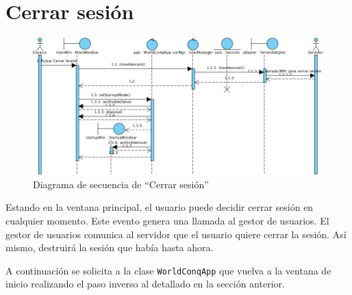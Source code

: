 \section{Cerrar sesión}

\begin{figure}[ht]
\centering
\includegraphics[scale=0.6]{img/ch03devel-logout.png}
\caption{Diagrama de secuencia de ``Cerrar sesión''}
\end{figure}

Estando en la ventana principal, el usuario puede decidir cerrar sesión en
cualquier momento. Este evento genera una llamada al gestor de usuarios. El
gestor de usuarios comunica al servidor que el usuario quiere cerrar la sesión.
Así mismo, destruirá la sesión que había hasta ahora.

A continuación se solicita a la clase \texttt{WorldConqApp} que vuelva a la
ventana de inicio realizando el paso inverso al detallado en la sección
anterior.
